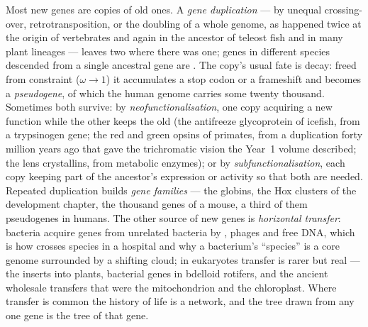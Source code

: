\begin{definition}\label{def:b3:molecular-evolution:duplication}
Most new genes are copies of old ones. A \emph{gene duplication} ---
by unequal crossing-over, retrotransposition, or the doubling of a
whole genome, as happened twice at the origin of vertebrates and again
in the ancestor of teleost fish and in many plant lineages --- leaves
two  where there was one; genes in different species
descended from a single ancestral gene are . The
copy's usual fate is decay: freed from constraint ($\omega \to 1$) it
accumulates a stop codon or a frameshift and becomes a
\emph{pseudogene}, of which the human genome carries some twenty
thousand. Sometimes both survive: by \emph{neofunctionalisation}, one
copy acquiring a new function while the other keeps the old (the
antifreeze glycoprotein of icefish, from a trypsinogen gene; the red
and green opsins of primates, from a duplication forty million years
ago that gave the trichromatic vision the Year~1 volume described; the
lens crystallins, from metabolic enzymes); or by
\emph{subfunctionalisation}, each copy keeping part of the ancestor's
expression or activity so that both are needed. Repeated duplication
builds \emph{gene families} --- the globins, the Hox clusters of the
development chapter, the thousand  genes of a mouse,
a third of them pseudogenes in humans. The other source of new genes is
\emph{horizontal transfer}: bacteria acquire genes from unrelated
bacteria by , phages and free DNA, which is how  crosses species in a hospital and why a bacterium's
``species'' is a core genome surrounded by a shifting cloud; in
eukaryotes transfer is rarer but real --- the  \emph{}
inserts into plants, bacterial genes in bdelloid rotifers, and the
ancient wholesale transfers that were the mitochondrion and the
chloroplast. Where transfer is common the history of life is a network,
and the tree drawn from any one gene is the tree of that gene.
\end{definition}

